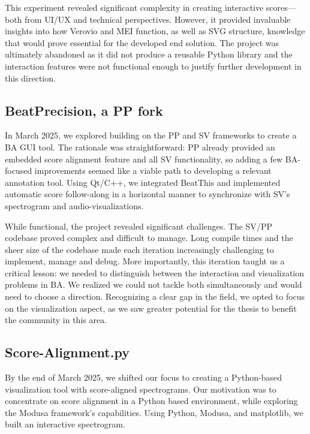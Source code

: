 This experiment revealed significant complexity in creating interactive scores—both from UI/UX and technical perspectives. However, it provided invaluable insights into how Verovio and \ac{MEI} function, as well as \ac{SVG} structure, knowledge that would prove essential for the developed end solution. The project was ultimately abandoned as it did not produce a reusable Python library and the interaction features were not functional  enough to justify further development in this direction. 

\subsection{\texorpdfstring{BeatPrecision, a \ac{PP} fork}{BeatPrecision, a PP fork}}
In March 2025, we explored building on the \ac{PP} and \ac{SV} frameworks to create a \ac{BA} \ac{GUI} tool. The rationale was straightforward: \ac{PP} already provided an embedded score alignment feature and all \ac{SV} functionality, so adding a few \ac{BA}-focused improvements seemed like a viable path to developing a relevant annotation tool. Using Qt/C++, we integrated BeatThis and implemented automatic score follow-along in a horizontal manner to synchronize with \ac{SV}'s spectrogram and audio-visualizations.

While functional, the project revealed significant challenges. The \ac{SV}/\ac{PP} codebase proved complex and difficult to manage. Long compile times and the sheer size of the codebase made each iteration increasingly challenging to implement, manage and debug. More importantly, this iteration taught us a critical lesson: we needed to distinguish between the interaction and visualization problems in \ac{BA}. We realized we could not tackle both simultaneously and would need to choose a direction. Recognizing a clear gap in the field, we opted to focus on the visualization aspect, as we saw greater potential for the thesis to benefit the community in this area. 

\subsection{Score-Alignment.py}
By the end of March 2025, we shifted our focus to creating a Python-based visualization tool with score-aligned spectrograms. Our motivation was to concentrate on score alignment in a Python based environment, while exploring the Modusa framework's capabilities. Using Python, Modusa, and matplotlib, we built an interactive spectrogram.

